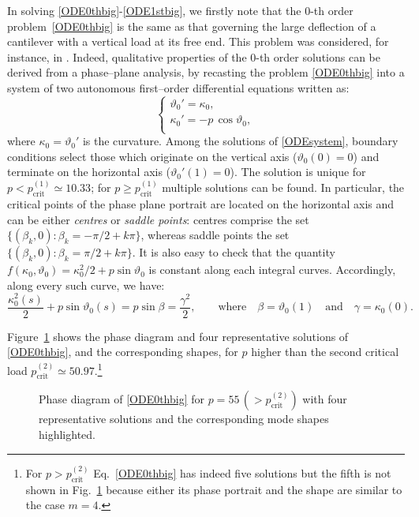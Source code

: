 \documentclass[oneside]{article}
\begin{document}
			In solving \eqref{ODE0thbig}-\eqref{ODE1stbig}, we firstly note that the 0-th order problem~\eqref{ODE0thbig} is the same as that governing the large deflection of a cantilever with a vertical load at its free end. This problem was considered, for instance, in \cite{Wang1981,Levyakov2010, Armanini2017}. Indeed, qualitative properties of the 0-th order solutions can be derived from a phase--plane analysis, by recasting the problem \eqref{ODE0thbig} into a system of two autonomous first--order differential equations written as:
			\begin{equation}\label{ODEsystem}
			\begin{cases}
			\vartheta_0'=\kappa_0,\\
			\kappa_0'=-p\,\cos\vartheta_0,\\
			\end{cases}
			\end{equation}
			where $\kappa_0=\vartheta_0'$ is the curvature. Among the solutions of \eqref{ODEsystem}, boundary conditions select those which originate on the vertical axis (${\vartheta_0(0)=0}$) and terminate on the horizontal axis (${\vartheta_0'(1)=0}$). 
			The solution is unique for $p<p_\text{crit}^{(1)}\simeq 10.33$; for $p\geq p_\text{crit}^{(1)}$ multiple solutions can be found. In particular, the critical points of the phase plane portrait  are located on the horizontal axis and can be either \textit{centres} or \textit{saddle points}: centres comprise the set $\{(\beta_k,0):\beta_k=-\pi/2+k\pi\}$, whereas saddle points the set $\{(\beta_k,0):\beta_k=\pi/2+k\pi\}$. 
			It is also easy to check that the quantity $f(\kappa_0,\vartheta_0)=\kappa_0^2/2+p\sin\vartheta_0$ is constant along each integral curves. Accordingly, along every such curve, we have: 
			\begin{equation}\label{eq:301}
			\frac{\kappa_0^2(s)}{2}+p\sin\vartheta_0(s)=p\sin\beta=\frac{\gamma^2}2,\qquad \text{where}\quad\beta=\vartheta_0(1)\quad\text{and}\quad \gamma=\kappa_0(0).
			\end{equation}
			
			Figure~\ref{fig:PhaseDiagram} shows the phase diagram and four representative solutions of \eqref{ODE0thbig}, and the corresponding shapes, for $p$  higher than the second critical load $p_\text{crit}^{(2)}\simeq 50.97$.\footnote{For $p>p_\text{crit}^{(2)}$ Eq.~\eqref{ODE0thbig} has indeed five solutions but the fifth is not shown in Fig.~\ref{fig:PhaseDiagram} because either its phase portrait and the shape are similar to the case $m=4$.}
			\begin{figure}[h]
				\begin{center}
					\begin{tiny}
						\def\svgwidth{1\textwidth}
						
					\end{tiny}
					\caption{Phase diagram of \eqref{ODE0thbig} for $p=55\,(>p_\text{crit}^{(2)})$ with four representative solutions and the corresponding mode shapes highlighted.}
					\label{fig:PhaseDiagram}
				\end{center}
			\end{figure}
			
\end{document}
